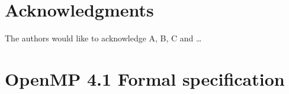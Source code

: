 \documentclass{article}
\begin{document}
\begin{comment}
\subsection{Use Cases}
We have identified several use cases of OpenMP interoperating with itself and other parallel programming models. 
\subsubsection{OpenMP with native threads}
\subsubsection{OpenMP with TBB/MKL}
\subsubsection{OpenMP with parallel scientific library, such as MKL}
\subsubsection{Linking libraries and objects built with different OpenMP compilers}
\subsubsection{OpenMP with inter-node model, e.g. MPI}

\subsection{Issues and Posibble Solutions}
\subsubsection{Active Oversubscription}
\subsubsection{Passive Oversubscription}
\subsubsection{Interop across contention group}
\end{comment}

\section*{Acknowledgments}

The authors would like to acknowledge A, B, C and \ldots

\clearpage



\appendix
\clearpage

\section{OpenMP 4.1 Formal specification}


\end{document}
